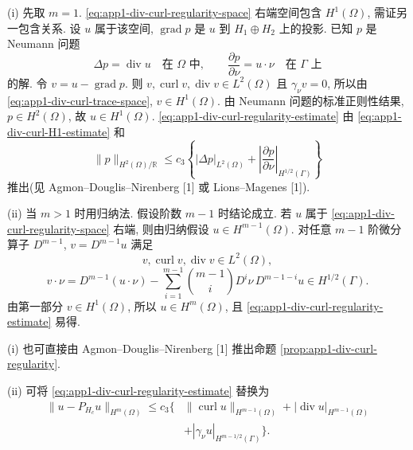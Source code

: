 \hypertarget{appendix-01-page-333}{}
\begin{Proof}
(i) 先取 $m=1$. \eqref{eq:app1-div-curl-regularity-space} 右端空间包含 $H^1(\Omega)$, 需证另一包含关系. 设 $u$ 属于该空间, $\operatorname{grad}p$ 是 $u$ 到 $H_1\oplus H_2$ 上的投影. 已知 $p$ 是 Neumann 问题
\begin{equation}
\Delta p=\operatorname{div}u\quad\text{在 }\Omega\text{ 中},
\qquad\frac{\partial p}{\partial\nu}=u\cdot\nu
\quad\text{在 }\Gamma\text{ 上}
\label{eq:app1-neumann-regularity-problem}
\end{equation}
的解. 令 $v=u-\operatorname{grad}p$. 则 $v,\operatorname{curl}v,\operatorname{div}v\in L^2(\Omega)$ 且 $\gamma_\nu v=0$, 所以由 \eqref{eq:app1-div-curl-trace-space}, $v\in H^1(\Omega)$. 由 Neumann 问题的标准正则性结果, $p\in H^2(\Omega)$, 故 $u\in H^1(\Omega)$. \eqref{eq:app1-div-curl-regularity-estimate} 由 \eqref{eq:app1-div-curl-H1-estimate} 和
\[
\lVert p\rVert_{H^2(\Omega)/\mathbb R}
\leq c_3\left\{|\Delta p|_{L^2(\Omega)}
+\left|\frac{\partial p}{\partial\nu}\right|_{H^{1/2}(\Gamma)}\right\}
\]
推出(见 Agmon--Douglis--Nirenberg [1] 或 Lions--Magenes [1]).

(ii) 当 $m>1$ 时用归纳法. 假设阶数 $m-1$ 时结论成立. 若 $u$ 属于 \eqref{eq:app1-div-curl-regularity-space} 右端, 则由归纳假设 $u\in H^{m-1}(\Omega)$. 对任意 $m-1$ 阶微分算子 $D^{m-1}$, $v=D^{m-1}u$ 满足
\[
v,\operatorname{curl}v,\operatorname{div}v\in L^2(\Omega),
\]
\[
v\cdot\nu
=D^{m-1}(u\cdot\nu)
-\sum_{i=1}^{m-1}\binom{m-1}{i}D^i\nu\,D^{m-1-i}u
\in H^{1/2}(\Gamma).
\]
由第一部分 $v\in H^1(\Omega)$, 所以 $u\in H^m(\Omega)$, 且 \eqref{eq:app1-div-curl-regularity-estimate} 易得.
\end{Proof}

\begin{Remark}
\label{rem:app1-regularity-refinements}
(i) 也可直接由 Agmon--Douglis--Nirenberg [1] 推出命题 \ref{prop:app1-div-curl-regularity}.

(ii) 可将 \eqref{eq:app1-div-curl-regularity-estimate} 替换为
\begin{equation}
\begin{aligned}
\lVert u-P_{H_c}u\rVert_{H^m(\Omega)}
\leq c_3\{&\lVert\operatorname{curl}u\rVert_{H^{m-1}(\Omega)}
+|\operatorname{div}u|_{H^{m-1}(\Omega)}\\
&+|\gamma_\nu u|_{H^{m-1/2}(\Gamma)}\}.
\end{aligned}
\label{eq:app1-div-curl-projected-estimate}
\end{equation}
\end{Remark}

